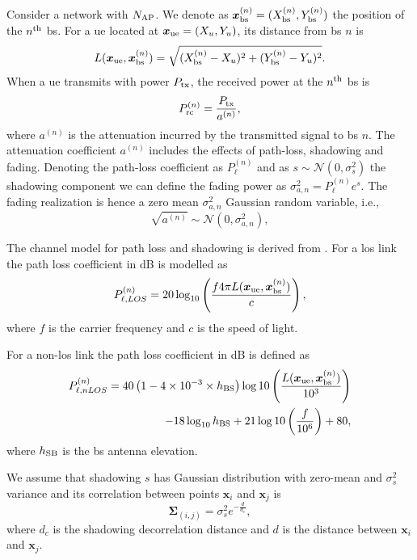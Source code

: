 \documentclass[conference]{IEEEtran}
\begin{document}
Consider a network with $N_{\rm AP}$. We denote as $\bm{x}_{\rm bs}^{(n)} =(X_{\rm bs}^{(n)},Y_{\rm bs}^{(n)})$ the position of the $n^{\rm th}$ \ac{bs}. For a \ac{ue} located at $\bm{x}_{\rm ue}=(X_u,Y_u)$, its distance from \ac{bs} $n$ is
\begin{equation}
    L(\bm{x}_{\rm ue},\bm{x}_{\rm bs}^{(n)}) = \sqrt{(X_{\rm bs}^{(n)}-X_u)^2+(Y_{\rm bs}^{(n)}-Y_u)^2}.
\end{equation}
When a \ac{ue} transmits with power $P_{\rm tx}$, the received power at the $n^{\rm th}$ \ac{bs} is
\begin{equation}\label{eq: rec pow}
    P_{\rm rc}^{(n)}= \frac{P_{\rm tx}}{a^{(n)}},
\end{equation}
where $a^{(n)}$ is the attenuation incurred by the transmitted signal to \ac{bs} $n$. The attenuation coefficient $a^{(n)}$ includes the effects of path-loss, shadowing and fading. Denoting the path-loss coefficient as $P_{\ell}^{(n)}$ and as $s \sim \mathcal{N}(0,\sigma_s^2)$ the shadowing component we can define the fading power as $\sigma_{a,n}^2={P_{\ell}^{(n)}}e^{s}$. The fading realization is hence a zero mean $\sigma_{a,n}^2$ Gaussian random variable, i.e.,
\begin{equation}
    \sqrt{a^{(n)}} \sim \mathcal{N}\left(0,\sigma_{a,n}^2\right),
\end{equation}

The channel model for path loss and shadowing is derived from \cite{3gpp}. For a \ac{los} link the path loss coefficient in dB is modelled as
\begin{equation}\label{eq:los}
    P_{\ell,LOS}^{(n)} = 20\log_{10}\left(\frac{f 4\pi L(\bm{x}_{\rm ue},\bm{x}_{\rm bs}^{(n)})}{c}\right),
\end{equation}
where $f$ is the carrier frequency and $c$ is the speed of light.

For a  non-\ac{los} link the path loss coefficient in dB is defined as
\begin{equation}
\begin{split}
    P_{\ell, nLOS}^{(n)} = 40\left(1-4\times 10^{-3}\times h_{\rm BS}\right) \log10\left (\frac{L(\bm{x}_{\rm ue},\bm{x}_{\rm bs}^{(n)})}{10^3}\right ) \\
    -18\log_{10}h_{\rm BS}
    + 21\log10\left(\frac{f}{10^6}\right) + 80,
    \end{split}
\end{equation}
where $h_{\rm SB}$ is the \ac{bs} antenna elevation.

We assume that shadowing $s$ has  Gaussian distribution with zero-mean and $\sigma_s^2$ variance and its correlation between points $\bm{x}_i$ and $\bm{x}_j$ is
\begin{equation}\label{eq: coor mat}
    \bm{\Sigma}_{(i,j)} = \sigma_s^2e^{-\frac{d}{d_c}},
\end{equation}
where $d_c$ is the shadowing decorrelation distance and $d$ is the distance between $\bm{x}_i$ and $\bm{x}_j$. 
\end{document}

